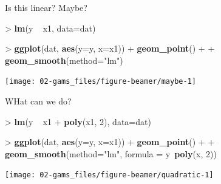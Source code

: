 \documentclass[10pt,ignorenonframetext,compress, aspectratio=169]{beamer}
\newenvironment{Shaded}{\begin{snugshade}}{\end{snugshade}}
\newcommand{\KeywordTok}[1]{\textcolor[rgb]{0.13,0.29,0.53}{\textbf{{#1}}}}
\newcommand{\DataTypeTok}[1]{\textcolor[rgb]{0.13,0.29,0.53}{{#1}}}
\newcommand{\DecValTok}[1]{\textcolor[rgb]{0.00,0.00,0.81}{{#1}}}
\newcommand{\StringTok}[1]{\textcolor[rgb]{0.31,0.60,0.02}{{#1}}}
\newcommand{\NormalTok}[1]{{#1}}
\begin{document}
\begin{frame}[fragile]{Is this linear? Maybe?}

\begin{Shaded}
\begin{Highlighting}[]
\NormalTok{>}\StringTok{ }\KeywordTok{lm}\NormalTok{(y ~}\StringTok{ }\NormalTok{x1, }\DataTypeTok{data=}\NormalTok{dat)}
\end{Highlighting}
\end{Shaded}

\begin{Shaded}
\begin{Highlighting}[]
\NormalTok{>}\StringTok{ }\KeywordTok{ggplot}\NormalTok{(dat, }\KeywordTok{aes}\NormalTok{(}\DataTypeTok{y=}\NormalTok{y, }\DataTypeTok{x=}\NormalTok{x1)) +}\StringTok{ }\KeywordTok{geom_point}\NormalTok{() +}
\NormalTok{+}\StringTok{     }\KeywordTok{geom_smooth}\NormalTok{(}\DataTypeTok{method=}\StringTok{"lm"}\NormalTok{)}
\end{Highlighting}
\end{Shaded}

\begin{center}\texttt{[image: 02-gams\_files/figure-beamer/maybe-1]} \end{center}

\end{frame}

\begin{frame}[fragile]{WHat can we do?}

\begin{Shaded}
\begin{Highlighting}[]
\NormalTok{>}\StringTok{ }\KeywordTok{lm}\NormalTok{(y ~}\StringTok{ }\NormalTok{x1 +}\StringTok{ }\KeywordTok{poly}\NormalTok{(x1, }\DecValTok{2}\NormalTok{), }\DataTypeTok{data=}\NormalTok{dat)}
\end{Highlighting}
\end{Shaded}

\begin{Shaded}
\begin{Highlighting}[]
\NormalTok{>}\StringTok{ }\KeywordTok{ggplot}\NormalTok{(dat, }\KeywordTok{aes}\NormalTok{(}\DataTypeTok{y=}\NormalTok{y, }\DataTypeTok{x=}\NormalTok{x1)) +}\StringTok{ }\KeywordTok{geom_point}\NormalTok{() +}
\NormalTok{+}\StringTok{     }\KeywordTok{geom_smooth}\NormalTok{(}\DataTypeTok{method=}\StringTok{"lm"}\NormalTok{, }\DataTypeTok{formula =} \NormalTok{y~}\KeywordTok{poly}\NormalTok{(x, }\DecValTok{2}\NormalTok{))}
\end{Highlighting}
\end{Shaded}

\begin{center}\texttt{[image: 02-gams\_files/figure-beamer/quadratic-1]} \end{center}

\end{frame}
\end{document}
